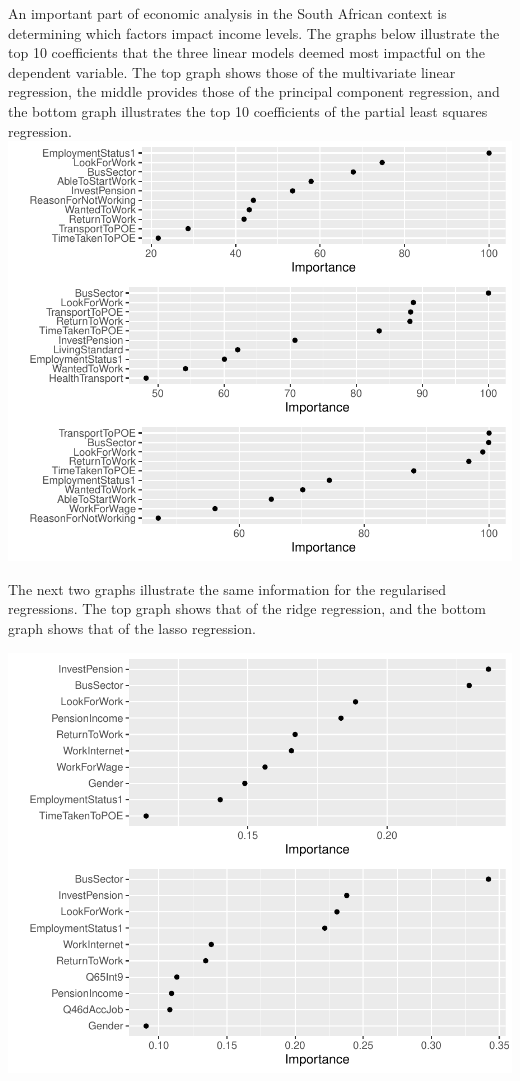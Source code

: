 \documentclass[11pt,preprint, authoryear]{elsarticle}
\numberwithin{equation}{section}
\numberwithin{figure}{section}
\numberwithin{table}{section}
\begin{document}
An important part of economic analysis in the South African context is
determining which factors impact income levels. The graphs below
illustrate the top 10 coefficients that the three linear models deemed
most impactful on the dependent variable. The top graph shows those of
the multivariate linear regression, the middle provides those of the
principal component regression, and the bottom graph illustrates the top
10 coefficients of the partial least squares regression.
\includegraphics{MLPDF_files/figure-latex/unnamed-chunk-15-1.pdf}

The next two graphs illustrate the same information for the regularised
regressions. The top graph shows that of the ridge regression, and the
bottom graph shows that of the lasso regression.

\includegraphics{MLPDF_files/figure-latex/unnamed-chunk-16-1.pdf}
\end{document}
